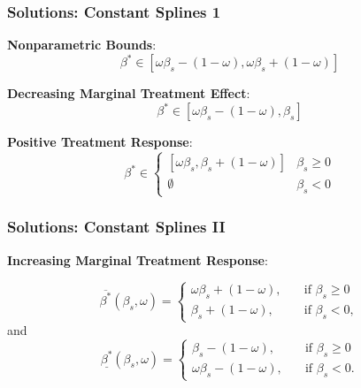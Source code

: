 \documentclass[11pt, aspectratio=169]{beamer}
\begin{document}
\begin{frame}
    \frametitle{Solutions: Constant Splines 1}

    \textbf{Nonparametric Bounds}:
    \begin{equation*}
        \beta^* \in [\omega\beta_s - (1 - \omega), \omega\beta_s + (1 - \omega)]
    \end{equation*}

    \vspace{0.5cm}

    \pause

    \textbf{Decreasing Marginal Treatment Effect}:
    \begin{equation*}
        \beta^* \in [\omega\beta_s - (1 - \omega), \beta_s]
    \end{equation*}

    \vspace{0.5cm}
    \pause

    \textbf{Positive Treatment Response}:
    \begin{equation*}
        \beta^* \in \begin{cases}
            [\omega\beta_s, \beta_s + (1 - \omega)] & \beta_s \geq 0 \\
            \emptyset & \beta_s < 0
        \end{cases}
    \end{equation*}

\end{frame}

\begin{frame}
    \frametitle{Solutions: Constant Splines II}

    \textbf{Increasing Marginal Treatment Response}:

    \begin{equation}\label{eq:solution_cs_increasing_mtr_upper}
        \overline{\beta^*}(\beta_s, \omega)=
        \begin{cases}
            \omega \beta_s + (1 - \omega),& \quad \text{if } \beta_s \geq 0\\
            \beta_s + (1 - \omega),              & \quad \text{if } \beta_s < 0,
        \end{cases}
    \end{equation}
    and
    \begin{equation}\label{eq:solution_cs_increasing_mtr_lower}
        \underline{\beta^*}(\beta_s, \omega)=
        \begin{cases}
            \beta_s - (1 - \omega),& \quad \text{if } \beta_s \geq 0\\
            \omega \beta_s - (1 - \omega),              & \quad \text{if } \beta_s < 0.
        \end{cases}
    \end{equation}

\end{frame}
\end{document}
